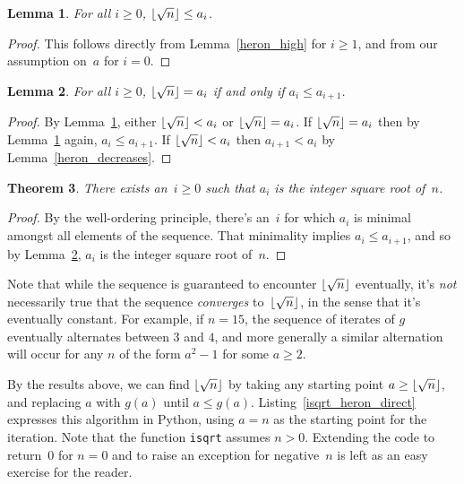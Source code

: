 \documentclass[a4paper]{article}
\DeclarePairedDelimiter\floor{\lfloor}{\rfloor}
\theoremstyle{plain}
\newtheorem{theorem}{Theorem}
\newtheorem{lemma}[theorem]{Lemma}
\theoremstyle{definition}
\begin{document}
\begin{lemma}\label{sequence_high}
  For all $i\ge 0$, $\floor{\sqrt n} \le a_i$.
\end{lemma}
\begin{proof}
  This follows directly from Lemma~\ref{heron_high} for $i\ge 1$, and
  from our assumption on~$a$ for $i=0$.
\end{proof}

\begin{lemma}\label{isqrt_condition}
  For all $i\ge 0$, $\floor{\sqrt n} = a_i$ if and only if $a_i\le a_{i+1}$.
\end{lemma}

\begin{proof}
  By Lemma~\ref{sequence_high}, either $\floor{\sqrt n} < a_i$ or $\floor{\sqrt
  n} = a_i$. If $\floor{\sqrt n} = a_i$ then by Lemma~\ref{sequence_high}
  again, $a_i \le a_{i+1}$. If $\floor{\sqrt n} < a_i$ then $a_{i+1} < a_i$ by
  Lemma~\ref{heron_decreases}.
\end{proof}

\begin{theorem}
  There exists an~$i\ge 0$ such that $a_i$ is the integer square root of~$n$.
\end{theorem}

\begin{proof}
  By the well-ordering principle, there's an~$i$ for which $a_i$ is minimal
  amongst all elements of the sequence. That minimality implies $a_i \le
  a_{i+1}$, and so by Lemma~\ref{isqrt_condition}, $a_i$ is the integer square
  root of~$n$.
\end{proof}

Note that while the sequence is guaranteed to encounter $\floor{\sqrt n}$
eventually, it's \emph{not} necessarily true that the sequence \emph{converges}
to~$\floor{\sqrt n}$, in the sense that it's eventually constant. For
example, if $n=15$, the sequence of iterates of $g$ eventually alternates
between $3$ and $4$, and more generally a similar alternation will occur for
any $n$ of the form $a^2 - 1$ for some $a \ge 2$.

By the results above, we can find $\floor{\sqrt n}$ by taking any starting
point $a \ge \floor{\sqrt n}$, and replacing $a$ with $g(a)$ until $a\le g(a)$.
Listing~\ref{isqrt_heron_direct} expresses this algorithm in Python, using
$a=n$ as the starting point for the iteration. Note that the function
\lstinline$isqrt$ assumes $n > 0$. Extending the code to return~$0$ for $n=0$
and to raise an exception for negative~$n$ is left as an easy exercise for the
reader.
\end{document}
